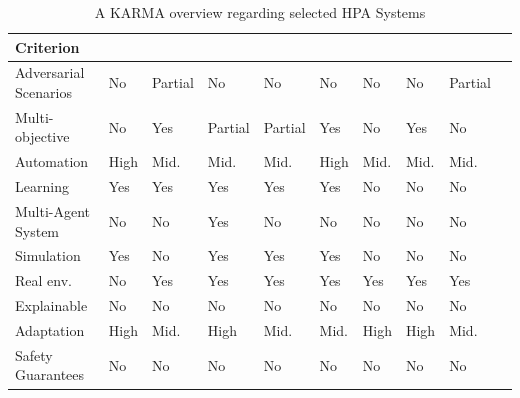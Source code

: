 \documentclass[conference]{IEEEtran}
\begin{document}
\begin{table}[h!]
    \centering
    \caption{A KARMA overview regarding selected HPA Systems}
    \label{tab:autoscaling_criteria}
    {\scriptsize
    \renewcommand{\arraystretch}{1.1}
    \begin{tabular}{>{\raggedright\arraybackslash}m{1.27cm}>{\centering\arraybackslash}m{0.47cm}>{\centering\arraybackslash}m{0.47cm}>{\centering\arraybackslash}m{0.47cm}>{\centering\arraybackslash}m{0.47cm}>{\centering\arraybackslash}m{0.47cm}>{\centering\arraybackslash}m{0.47cm}>{\centering\arraybackslash}m{0.47cm}>{\centering\arraybackslash}m{0.47cm}>{\centering\arraybackslash}m{0.75cm}}
    \hline
    \textbf{Criterion} & \vspace{-0.3cm}\textbf{\cite{gymhpa2022}} & \vspace{-0.3cm}\textbf{\cite{aware2023}} & \vspace{-0.3cm}\textbf{\cite{imam2022}} & \vspace{-0.3cm}\textbf{\cite{Libra}} & \vspace{-0.3cm}\textbf{\cite{QoSRL}} & \vspace{-0.3cm}\textbf{\cite{AHPA}} & \vspace{-0.3cm}\textbf{\cite{KOSMOS}} & \vspace{-0.3cm}\textbf{\cite{COPA}} \\
    \hline
    \hline
    Adversarial Scenarios & No & Partial & No & No & No & No & No & Partial \\
    \hline
    Multi-objective & No & Yes & Partial & Partial & Yes & No & Yes & No \\
    \hline
    Automation & High & Mid. & Mid. & Mid. & High & Mid. & Mid. & Mid. \\
    \hline
    Learning & Yes & Yes & Yes & Yes & Yes & No & No & No \\
    \hline
    Multi-Agent System & No & No & Yes & No & No & No & No & No \\
    \hline
    Simulation & Yes & No & Yes & Yes & Yes & No & No & No \\
    \hline
    Real env. & No & Yes & Yes & Yes & Yes & Yes & Yes & Yes \\
    \hline
    Explainable & No & No & No & No & No & No & No & No \\
    \hline
    Adaptation & High & Mid. & High & Mid. & Mid. & High & High & Mid. \\
    \hline
    Safety Guarantees & No & No & No & No & No & No & No & No \\
    \hline
    \end{tabular}%
    }
  \end{table}
\end{document}
